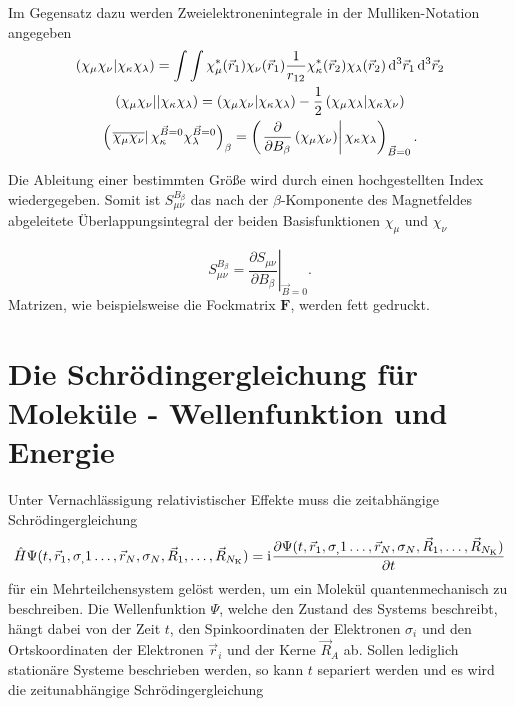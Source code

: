 Im Gegensatz dazu werden Zweielektronenintegrale in der Mulliken-Notation angegeben
\begin{gather*}
	\left(\chi_\mu\chi_\nu\vert\chi_\kappa\chi_\lambda\right)=\int\int\chi_\mu^*(\vec{r}_1)\chi_\nu(\vec{r}_1)\frac{1}{r_{12}}\chi_\kappa^*(\vec{r}_2)\chi_\lambda(\vec{r}_2)\mathop{}\!\mathrm{d^3} \vec{r}_1 \mathop{}\!\mathrm{d^3} \vec{r}_2\\
    \left(\chi_\mu\chi_\nu\vert\vert\chi_\kappa\chi_\lambda\right)=\left(\chi_\mu\chi_\nu\vert\chi_\kappa\chi_\lambda\right)-\frac{1}{2}\left(\chi_\mu\chi_\lambda\vert\chi_\kappa\chi_\nu\right)\\
    \left(\left.\overline{\chi_\mu\chi_\nu}\right\vert\chi_\kappa^{\vec{B}=0 }\chi_\lambda^{\vec{B}=0}\right)_\beta=\left(\left.\frac{\partial}{\partial B_\beta}\left(\chi_\mu\chi_\nu\right)\right|\chi_\kappa\chi_\lambda\right)_{\vec{B} = 0}.
\end{gather*}

Die Ableitung einer bestimmten Größe wird durch einen hochgestellten Index wiedergegeben. Somit ist $S^{B_\beta}_{\mu\nu}$ das nach der $\beta$-Komponente des Magnetfeldes abgeleitete Überlappungsintegral der beiden Basisfunktionen $\chi_\mu$ und $\chi_\nu$

\begin{equation*}
  S^{B_\beta}_{\mu\nu}=\left.\frac{\partial S_{\mu\nu}}{\partial B_\beta}\right|_{\vec{B} = 0}.
\end{equation*} 
Matrizen, wie beispielsweise die Fockmatrix $\boldsymbol{F}$, werden fett gedruckt.
\section{Die Schrödingergleichung für Moleküle - Wellenfunktion und Energie}

Unter Vernachlässigung relativistischer Effekte muss die zeitabhängige Schrödingergleichung
\begin{equation}
  \hat{H}\Psi(t,\vec{r}_1,\sigma_,1\dotsc,\vec{r}_N,\sigma_N,\vec{R}_1,\dotsc,\vec{R}_{N_{\text{K}}})=\mathrm{i}\mkern1mu\frac{\partial\Psi(t,\vec{r}_1,\sigma_,1\dotsc,\vec{r}_N,\sigma_N,\vec{R}_1,\dotsc,\vec{R}_{N_{\text{K}}})}{\partial t}
\end{equation}
für ein Mehrteilchensystem gelöst werden, um ein Molekül quantenmechanisch zu beschreiben. Die Wellenfunktion $\Psi$, welche den Zustand des Systems beschreibt, hängt dabei von der Zeit $t$, den Spinkoordinaten der Elektronen $\sigma_i$ und den Ortskoordinaten der Elektronen $\vec{r}_i$ und der Kerne $\vec{R}_A$ ab. Sollen lediglich stationäre Systeme beschrieben werden, so kann $t$ separiert werden und es wird die zeitunabhängige Schrödingergleichung 

